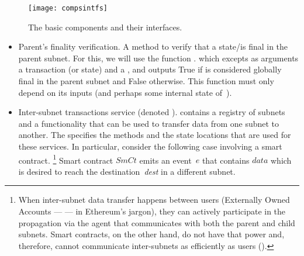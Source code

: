 \begin{figure}[h]
     \centering
     \texttt{[image: compsintfs]}
     \caption{The basic components and their interfaces.}
     \label{fig:interfaces}
 \end{figure}


\begin{itemize}
    \item Parent's finality verification. A method to verify that a state/\tx is final in the parent subnet. For this, we will use the function \gw.\verifyPfinal{\tx}{\prf} which excepts as arguments a transaction (or state) and a \prf, and outputs True if \tx is considered globally final in the parent subnet and False otherwise. This function must only depend on its inputs (and perhaps some internal state of~\gw).
    \item Inter-subnet transactions service (denoted \postoffice). 
    \gw contains a registry of subnets and a functionality that can be used to transfer data from one subnet to another. 
    The \postoffice specifies the methods and the state locations that are used for these services.
    In particular, consider the following case involving a smart contract.%
    \footnote{When inter-subnet data transfer happens between users (Externally Owned Accounts --- \eoa --- in Ethereum's jargon), they can actively participate in the propagation via the \nameAbbr agent that communicates with both the parent and child subnets. Smart contracts, on the other hand, do not have that power and, therefore, cannot communicate inter-subnets as efficiently as users (\eoa).}
    Smart contract $\textit{SmCt}$ emits an event~$e$ that contains $\textit{data}$ which is desired to reach the destination~\textit{dest} in a different subnet.
\end{itemize}
 
 
 